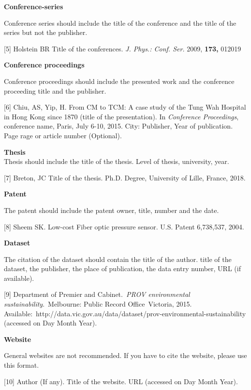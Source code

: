 \documentclass{ELSP}
\begin{document}
\textbf{Conference-series}

Conference series should include the title of the conference and the
title of the series but not the publisher.

{[}5{]} Holstein BR Title of the conferences. \textit{J. Phys.: Conf.
		Ser.} 2009, \textbf{173,} 012019

\textbf{Conference proceedings}

Conference proceedings should include the presented work and the
conference proceeding title and the publisher.

{[}6{]} Chiu, AS, Yip, H. From CM to TCM: A case study of the Tung Wah
	Hospital in Hong Kong since 1870 (title of the presentation). In
	\textit{Conference Proceedings}, conference name, Paris, July 6-10,
	2015. City: Publisher, Year of publication. Page rage or article
	number (Optional).

\textbf{Thesis}\\
Thesis should include the title of the thesis. Level of thesis,
university, year.

{[}7{]} Breton, JC Title of the thesis. Ph.D. Degree, University of
	Lille, France, 2018.

\textbf{Patent}

The patent should include the patent owner, title, number and the date.

{[}8{]} Sheem SK. Low-cost Fiber optic pressure sensor. U.S. Patent
	6,738,537, 2004.

\textbf{Dataset}

The citation of the dataset should contain the title of the author.
title of the dataset, the publisher, the place of publication, the data
entry number, URL (if available).

{[}9{]} Department of Premier and Cabinet.\textit{~PROV environmental
		sustainability}.~Melbourne: Public Record Office~Victoria, 2015.
	Available:~http://data.vic.gov.au/data/dataset/prov-environmental-sustainability
	(accessed on Day Month Year).

\textbf{Website}

General websites are not recommended. If you have to cite the website,
please use this format.

{[}10{]} Author (If any). Title of the website. URL (accessed on Day
	Month Year).

 
  
\end{document}
